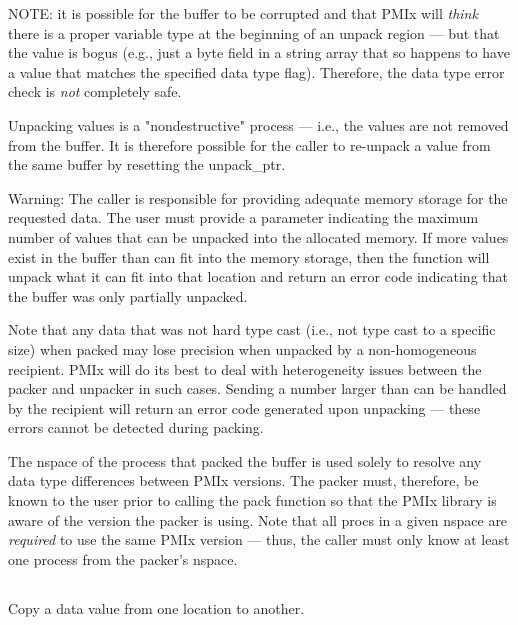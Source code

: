 NOTE: it is possible for the buffer to be corrupted and that \ac{PMIx} will \textit{think} there is a proper variable type at the beginning of an unpack region --- but that the value is bogus (e.g., just a byte field in a string array that so happens to have a value that matches the specified data type flag). Therefore, the data type error check is \textit{not} completely safe.

Unpacking values is a "nondestructive" process --- i.e., the values are not removed from the buffer. It is therefore possible for the caller to re-unpack a value from the same buffer by resetting the unpack_ptr.

Warning: The caller is responsible for providing adequate memory storage for the requested data. The user must provide a parameter indicating the maximum number of values that can be unpacked into the allocated memory. If more values exist in the buffer than can fit into the memory storage, then the function will unpack what it can fit into that location and return an error code indicating that the buffer was only partially unpacked.

Note that any data that was not hard type cast (i.e., not type cast to a specific size) when packed may lose precision when unpacked by a non-homogeneous recipient. \ac{PMIx} will do its best to deal with heterogeneity issues between the packer and unpacker in such cases. Sending a number larger than can be handled by the recipient will return an error code generated upon unpacking --- these errors cannot be detected during packing.

The nspace of the process that packed the buffer is used solely to resolve any data type
differences between \ac{PMIx} versions. The packer must, therefore, be
known to the user prior to calling the pack function so that the
\ac{PMIx} library is aware of the version the packer is using. Note that
all procs in a given nspace are \textit{required} to use the same \ac{PMIx}
version --- thus, the caller must only know at least one process from the
packer's nspace.


\subsection{}

\summary

Copy a data value from one location to another.

\format


